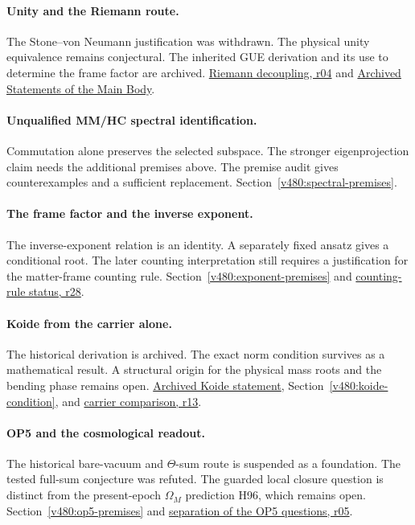 \paragraph{Unity and the Riemann route.}
The Stone--von Neumann justification was withdrawn. The physical
unity equivalence remains conjectural. The inherited GUE derivation
and its use to determine the frame factor are archived.
\hyperref[sec:v480-r04-riemann-decoupling]{Riemann decoupling, r04}
and \hyperref[sec:v490-archive]{Archived Statements of the Main Body}.

\paragraph{Unqualified MM/HC spectral identification.}
Commutation alone preserves the selected subspace. The stronger
eigenprojection claim needs the additional premises above. The
premise audit gives counterexamples and a sufficient replacement.
Section~\ref{v480:spectral-premises}.

\paragraph{The frame factor and the inverse exponent.}
The inverse-exponent relation is an identity. A separately fixed
ansatz gives a conditional root. The later counting interpretation
still requires a justification for the matter-frame counting rule.
Section~\ref{v480:exponent-premises} and
\hyperref[sec:v4100-r28-bend-counting-status]{counting-rule status, r28}.

\paragraph{Koide from the carrier alone.}
The historical derivation is archived. The exact norm condition
survives as a mathematical result. A structural origin for the
physical mass roots and the bending phase remains open.
\hyperref[sec:v490-archive]{Archived Koide statement},
Section~\ref{v480:koide-condition}, and
\hyperref[sec:v4100-r13-neutral-qubit-family]{carrier comparison, r13}.

\paragraph{OP5 and the cosmological readout.}
The historical bare-vacuum and $\Theta$-sum route is suspended as a
foundation. The tested full-sum conjecture was refuted. The guarded
local closure question is distinct from the present-epoch
$\Omega_M$ prediction H96, which remains open.
Section~\ref{v480:op5-premises} and
\hyperref[sec:v4100-r05-core-review]{separation of the OP5 questions, r05}.

